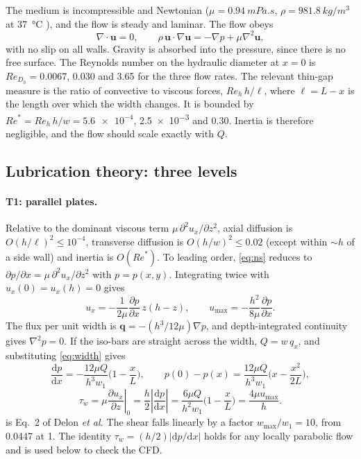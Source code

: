 \documentclass[11pt,a4paper]{article}
\newcommand{\taw}{\tau_{w}}
\newcommand{\dd}{\mathrm{d}}
\newcommand{\Rey}{\mathit{Re}}
\begin{document}
The medium is incompressible and Newtonian ($\mu=\SI{0.94}{mPa.s}$, $\rho=\SI{981.8}{kg/m^3}$ at \SI{37}{\celsius} \citep{Delon2020}), and the flow is steady and laminar. The flow obeys
\begin{equation}
\nabla\cdot\bm u=0,\qquad \rho\,\bm u\cdot\nabla\bm u=-\nabla p+\mu\nabla^2\bm u,
\label{eq:ns}
\end{equation}
with no slip on all walls. Gravity is absorbed into the pressure, since there is no free surface. The Reynolds number on the hydraulic diameter at $x=0$ is $\Rey_{D_h}=0.0067$, 0.030 and 3.65 for the three flow rates. The relevant thin-gap measure is the ratio of convective to viscous forces, $\Rey_h\,h/\ell$, where $\ell=L-x$ is the length over which the width changes. It is bounded by $\Rey^*=\Rey_h\,h/w=\num{5.6e-4}$, \num{2.5e-3} and 0.30. Inertia is therefore negligible, and the flow should scale exactly with $Q$.

\subsection{Lubrication theory: three levels}
\label{sec:theory}

\paragraph{T1: parallel plates.} Relative to the dominant viscous term $\mu\,\partial^2u_x/\partial z^2$, axial diffusion is $O(h/\ell)^2\le10^{-4}$, transverse diffusion is $O(h/w)^2\le0.02$ (except within $\sim h$ of a side wall) and inertia is $O(\Rey^*)$. To leading order, \cref{eq:ns} reduces to $\partial p/\partial x=\mu\,\partial^2u_x/\partial z^2$ with $p=p(x,y)$. Integrating twice with $u_x(0)=u_x(h)=0$ gives
\begin{equation}
u_x=-\frac{1}{2\mu}\frac{\partial p}{\partial x}\,z(h-z),\qquad u_{\max}=-\frac{h^2}{8\mu}\frac{\partial p}{\partial x}.
\label{eq:parabola}
\end{equation}
The flux per unit width is $\bm q=-(h^3/12\mu)\nabla p$, and depth-integrated continuity gives $\nabla^2p=0$. If the iso-bars are straight across the width, $Q=w\,q_x$, and substituting \cref{eq:width} gives
\begin{equation}
\frac{\dd p}{\dd x}=-\frac{12\mu Q}{h^3w_1}\Big(1-\frac xL\Big),\qquad
p(0)-p(x)=\frac{12\mu Q}{h^3w_1}\Big(x-\frac{x^2}{2L}\Big),
\label{eq:dpdx}
\end{equation}
\begin{equation}
\taw=\mu\left.\frac{\partial u_x}{\partial z}\right|_{0}=\frac h2\left|\frac{\dd p}{\dd x}\right|=\frac{6\mu Q}{h^2w_1}\Big(1-\frac xL\Big)=\frac{4\mu u_{\max}}{h}.
\label{eq:eq2}
\end{equation}
 is Eq.~2 of Delon \emph{et al.} The shear falls linearly by a factor $w_{\max}/w_1=10$, from \SI{0.0447}{\dyncm} at \SI{1}{\uLmin}. The identity $\taw=(h/2)|\dd p/\dd x|$ holds for any locally parabolic flow and is used below to check the CFD.
\end{document}
